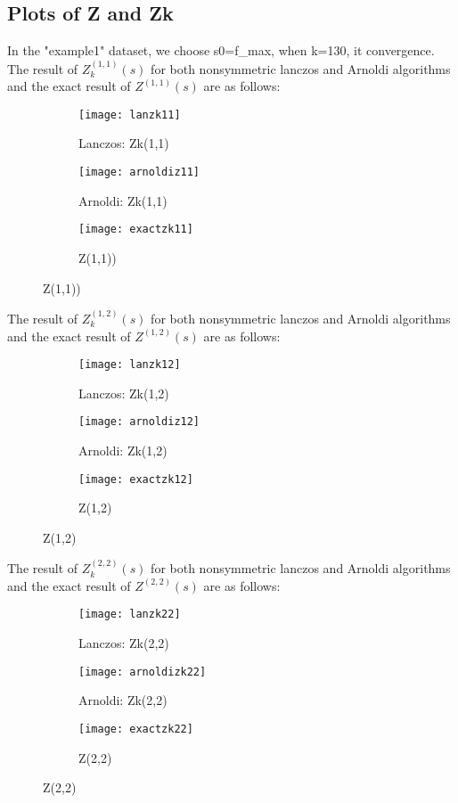 \documentclass[11pt]{article}
\begin{document}
\subsection{Plots of Z and Zk}
In the "example1" dataset, we choose s0=f_max, when k=130, it convergence. The result of $Z_k^{(1,1)}(s)$ for both nonsymmetric lanczos and Arnoldi algorithms and the exact result of $Z^{(1,1)}(s)$ are as follows:\\
\begin{figure}
	\centering
	\begin{subfigure}{.3\textwidth}
		\centering
		\texttt{[image: lanzk11]}
		\caption{Lanczos: Zk(1,1)}
	\end{subfigure}
	\begin{subfigure}{.3\textwidth}
		\centering
		\texttt{[image: arnoldiz11]}
		\caption{Arnoldi: Zk(1,1)}
	\end{subfigure}
	\begin{subfigure}{.3\textwidth}
			\centering
			\texttt{[image: exactzk11]}
			\caption{Z(1,1))}
	\end{subfigure}
\end{figure}
 The result of $Z_k^{(1,2)}(s)$ for both nonsymmetric lanczos and Arnoldi algorithms and the exact result of $Z^{(1,2)}(s)$ are as follows:\\
\begin{figure}
	\centering
	\begin{subfigure}{.3\textwidth}
		\centering
		\texttt{[image: lanzk12]}
		\caption{Lanczos: Zk(1,2)}
	\end{subfigure}
	\begin{subfigure}{.3\textwidth}
		\centering
		\texttt{[image: arnoldiz12]}
		\caption{Arnoldi: Zk(1,2)}
	\end{subfigure}
	\begin{subfigure}{.3\textwidth}
		\centering
		\texttt{[image: exactzk12]}
		\caption{Z(1,2)}
	\end{subfigure}
\end{figure}
The result of $Z_k^{(2,2)}(s)$ for both nonsymmetric lanczos and Arnoldi algorithms and the exact result of $Z^{(2,2)}(s)$ are as follows:\\
\begin{figure}
	\centering
	\begin{subfigure}{.3\textwidth}
		\centering
		\texttt{[image: lanzk22]}
		\caption{Lanczos: Zk(2,2)}
	\end{subfigure}
	\begin{subfigure}{.3\textwidth}
		\centering
		\texttt{[image: arnoldizk22]}
		\caption{Arnoldi: Zk(2,2)}
	\end{subfigure}
	\begin{subfigure}{.3\textwidth}
		\centering
		\texttt{[image: exactzk22]}
		\caption{Z(2,2)}
	\end{subfigure}
\end{figure}
\end{document}
